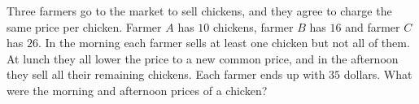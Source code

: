 Three farmers go to the market to sell chickens, and they agree to charge the same price per chicken. Farmer $A$ has $10$ chickens, farmer $B$ has $16$ and farmer $C$ has $26$. In the morning each farmer sells at least one chicken but not all of them. At lunch they all lower the price to a new common price, and in the afternoon they sell all their remaining chickens. Each farmer ends up with $35$ dollars. What were the morning and afternoon prices of a chicken?
